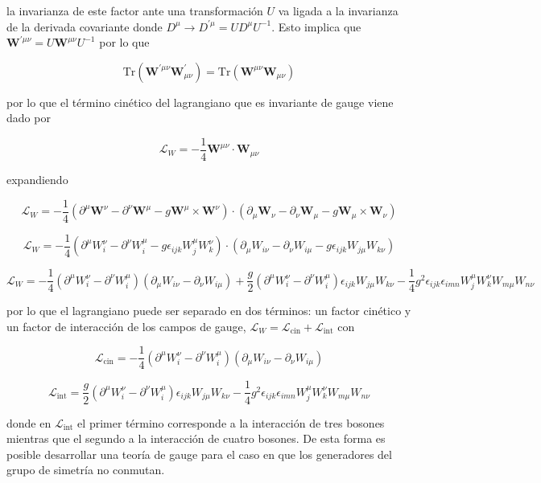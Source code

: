 la invarianza de este factor ante una transformación $U$ va ligada a la invarianza de la derivada covariante donde $D^{\mu}\rightarrow D^{'\mu}=UD^{\mu}U^{-1}$. Esto implica que $\textbf{W}^{'\mu\nu} = U\textbf{W}^{\mu\nu}U^{-1}$ por lo que 

$$ \text{Tr}(\textbf{W}^{'\mu\nu}\textbf{W}_{\mu\nu}^{'}) = \text{Tr}(\textbf{W}^{\mu\nu}\textbf{W}_{\mu\nu}) $$

por lo que el término cinético del lagrangiano que es invariante de gauge viene dado por

$$ \mathcal{L}_W = -\frac{1}{4}\textbf{W}^{\mu\nu}\cdot \textbf{W}_{\mu\nu} $$

expandiendo

$$ \mathcal{L}_W = -\frac{1}{4}(\partial^{\mu}\textbf{W}^{\nu} - \partial^{\nu}\textbf{W}^{\mu} - g\textbf{W}^{\mu}\times \textbf{W}^{\nu})\cdot (\partial_{\mu}\textbf{W}_{\nu} - \partial_{\nu}\textbf{W}_{\mu} - g\textbf{W}_{\mu}\times \textbf{W}_{\nu}) $$

$$ \mathcal{L}_W = -\frac{1}{4}(\partial^{\mu}W_i^{\nu} - \partial^{\nu}W_i^{\mu} - g\epsilon_{ijk}W_j^{\mu} W_k^{\nu})\cdot (\partial_{\mu}W_{i\nu} - \partial_{\nu}W_{i\mu} - g\epsilon_{ijk}W_{j\mu} W_{k\nu}) $$

\begin{equation}
    \mathcal{L}_W = -\frac{1}{4}(\partial^{\mu}W_i^{\nu} - \partial^{\nu}W_i^{\mu})(\partial_{\mu}W_{i\nu} - \partial_{\nu}W_{i\mu}) + \frac{g}{2}(\partial^{\mu}W_i^{\nu} - \partial^{\nu}W_i^{\mu})\epsilon_{ijk}W_{j\mu}W_{k\nu} -\frac{1}{4}g^2\epsilon_{ijk}\epsilon_{imn}W_j^{\mu}W_k^{\nu}W_{m\mu}W_{n\nu} 
    \label{lancinc}
\end{equation}

por lo que el lagrangiano puede ser separado en dos términos: un factor cinético y un factor de interacción de los campos de gauge, $\mathcal{L}_W = \mathcal{L}_{\text{cin}}+\mathcal{L}_{\text{int}}$ con

$$ \mathcal{L}_{\text{cin}} = -\frac{1}{4}(\partial^{\mu}W_i^{\nu} - \partial^{\nu}W_i^{\mu})(\partial_{\mu}W_{i\nu} - \partial_{\nu}W_{i\mu}) $$

$$ \mathcal{L}_{\text{int}} = \frac{g}{2}(\partial^{\mu}W_i^{\nu} - \partial^{\nu}W_i^{\mu})\epsilon_{ijk}W_{j\mu}W_{k\nu} -\frac{1}{4}g^2\epsilon_{ijk}\epsilon_{imn}W_j^{\mu}W_k^{\nu}W_{m\mu}W_{n\nu} $$

donde en $\mathcal{L}_{\text{int}}$ el primer término corresponde a la interacción de tres bosones mientras que el segundo a la interacción de cuatro bosones. De esta forma es posible desarrollar una teoría de gauge para el caso en que los generadores del grupo de simetría no conmutan.

